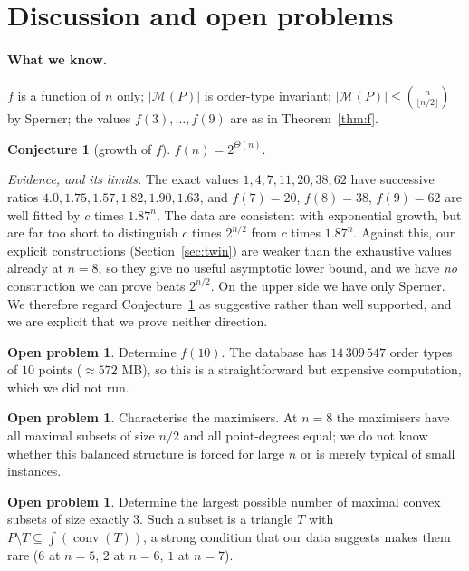 \documentclass[11pt,a4paper]{article}
\theoremstyle{definition}
\newtheorem{conjecture}[theorem]{Conjecture}
\newtheorem{openproblem}[theorem]{Open problem}
\newcommand{\conv}{\operatorname{conv}}
\newcommand{\M}{\mathcal{M}}
\begin{document}
\section{Discussion and open problems}
\label{sec:open}

\paragraph{What we know.} $f$ is a function of $n$ only; $|\M(P)|$ is order-type
invariant; $|\M(P)|\le\binom{n}{\lfloor n/2\rfloor}$ by Sperner; the values
$f(3),\dots,f(9)$ are as in Theorem~\ref{thm:f}.

\begin{conjecture}[growth of $f$]
\label{conj:growth}
$f(n)=2^{\Theta(n)}$.
\end{conjecture}

\begingroup
\sloppy
\noindent
\emph{Evidence, and its limits.}  The exact values $1,4,7,11,20,38,62$ have
successive ratios $4.0,1.75,1.57,1.82,1.90,1.63$, and $f(7)=20$, $f(8)=38$,
$f(9)=62$ are well fitted by $c$ times $1.87^n$.  The data are consistent with
exponential growth, but are far too short to distinguish $c$ times $2^{n/2}$
from $c$ times $1.87^n$.  Against this, our explicit constructions
(Section~\ref{sec:twin}) are weaker than the exhaustive values already at $n=8$,
so they give no useful asymptotic lower bound, and we have \emph{no} construction
we can prove beats $2^{n/2}$.  On the upper side we have only Sperner.  We
therefore regard Conjecture~\ref{conj:growth} as suggestive rather than well
supported, and we are explicit that we prove neither direction.
\par
\endgroup

\begin{openproblem}
Determine $f(10)$.  The database has $14\,309\,547$ order types of $10$ points
($\approx 572$ MB), so this is a straightforward but expensive computation, which we
did not run.
\end{openproblem}

\begin{openproblem}
Characterise the maximisers.  At $n=8$ the maximisers have all maximal subsets of
size $n/2$ and all point-degrees equal; we do not know whether this balanced
structure is forced for large $n$ or is merely typical of small instances.
\end{openproblem}

\begin{openproblem}
Determine the largest possible number of maximal convex subsets of size exactly
$3$.  Such a subset is a triangle $T$ with $P\setminus T\subseteq\int(\conv(T))$, a
strong condition that our data suggests makes them rare ($6$ at $n=5$, $2$ at
$n=6$, $1$ at $n=7$).
\end{openproblem}
\end{document}

